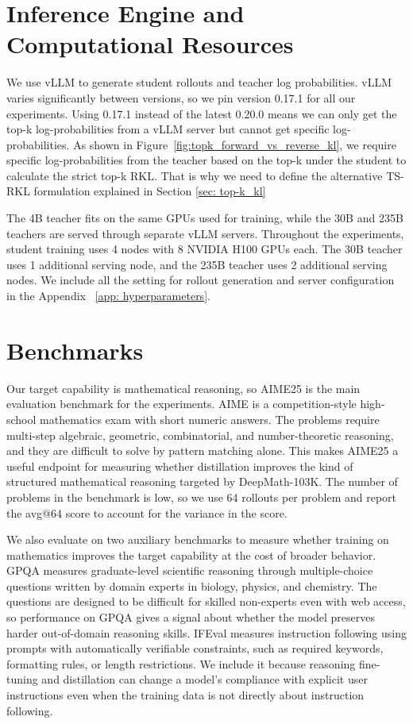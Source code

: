 \section{Inference Engine and Computational Resources} \label{sec: inference_engine}

We use vLLM \cite{kwon2023efficient} to generate student rollouts and teacher log probabilities. vLLM varies significantly between versions, so we pin version 0.17.1 for all our experiments. Using 0.17.1 instead of the latest 0.20.0 means we can only get the top-k log-probabilities from a vLLM server but cannot get specific log-probabilities. As shown in Figure~\ref{fig:topk_forward_vs_reverse_kl}, we require specific log-probabilities from the teacher based on the top-k under the student to calculate the strict top-k RKL. That is why we need to define the alternative TS-RKL formulation explained in Section \ref{sec: top-k_kl}

The 4B teacher fits on the same GPUs used for training, while the 30B and 235B teachers are served through separate vLLM servers. Throughout the experiments, student training uses 4 nodes with 8 NVIDIA H100 GPUs each. The 30B teacher uses 1 additional serving node, and the 235B teacher uses 2 additional serving nodes. We include all the setting for rollout generation and server configuration in the Appendix ~\ref{app: hyperparameters}.


\section{Benchmarks}

Our target capability is mathematical reasoning, so AIME25 \cite{aime25} is the main evaluation benchmark for the experiments. AIME is a competition-style high-school mathematics exam with short numeric answers. The problems require multi-step algebraic, geometric, combinatorial, and number-theoretic reasoning, and they are difficult to solve by pattern matching alone. This makes AIME25 a useful endpoint for measuring whether distillation improves the kind of structured mathematical reasoning targeted by DeepMath-103K. The number of problems in the benchmark is low, so we use 64 rollouts per problem and report the avg@64 score to account for the variance in the score.

We also evaluate on two auxiliary benchmarks to measure whether training on mathematics improves the target capability at the cost of broader behavior. GPQA \cite{reinGPQAGraduateLevelGoogleProof2023} measures graduate-level scientific reasoning through multiple-choice questions written by domain experts in biology, physics, and chemistry. The questions are designed to be difficult for skilled non-experts even with web access, so performance on GPQA gives a signal about whether the model preserves harder out-of-domain reasoning skills. IFEval \cite{zhou2023instructionfollowingevaluationlargelanguage} measures instruction following using prompts with automatically verifiable constraints, such as required keywords, formatting rules, or length restrictions. We include it because reasoning fine-tuning and distillation can change a model's compliance with explicit user instructions even when the training data is not directly about instruction following.

